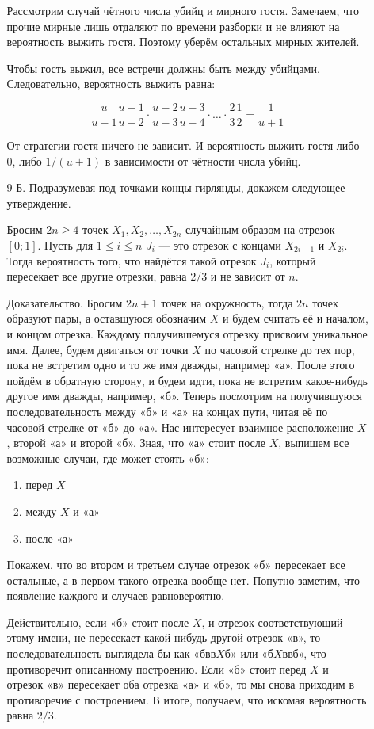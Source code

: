 \begin{enumerate}
\begin{enumerate}
Рассмотрим случай чётного числа убийц и мирного гостя. Замечаем, что прочие мирные
лишь отдаляют по времени разборки и не влияют на вероятность выжить гостя.
Поэтому уберём остальных мирных жителей.

Чтобы гость выжил, все встречи должны быть между убийцами. Следовательно, вероятность
выжить равна:

\[
\frac{u}{u-1}\frac{u-1}{u-2} \cdot \frac{u-2}{u-3}\frac{u-3}{u-4}\cdot \ldots
\cdot \frac{2}{3}\frac{1}{2} = \frac{1}{u+1}
\]

От стратегии гостя ничего не зависит.
И вероятность выжить гостя либо 0, либо $1/(u+1)$ в зависимости от чётности числа убийц.

\item[9-Б.]
Подразумевая под точками концы гирлянды, докажем следующее утверждение.

Бросим $2n \geq 4$ точек $X_1, X_2, \ldots, X_{2n}$ случайным образом на отрезок
$[0;1]$. Пусть для $1 \leq i \leq n$ $J_i$ — это отрезок с концами $X_{2i-1}$ и $X_{2i}$.
Тогда вероятность того, что найдётся такой отрезок $J_i$, который пересекает все
другие отрезки, равна $2/3$ и не зависит от $n$.

Доказательство. Бросим $2n+1$ точек на окружность, тогда $2n$ точек образуют пары,
а оставшуюся обозначим $X$ и будем считать её и началом, и концом отрезка. Каждому
получившемуся отрезку присвоим уникальное имя. Далее, будем двигаться от точки $X$
по часовой стрелке до тех пор, пока не встретим одно и то же имя дважды, например «а».
После этого пойдём в обратную сторону, и будем идти, пока не встретим какое-нибудь
другое имя дважды, например, «б». Теперь посмотрим на получившуюся последовательность
между «б» и «а» на концах пути, читая её по часовой стрелке от «б» до «а». Нас
интересует взаимное расположение $X$, второй «а» и второй «б». Зная, что «а» стоит
после $X$, выпишем все возможные случаи, где может стоять «б»:
\begin{enumerate}
\item перед $X$
\item между $X$ и «а»
\item после «а»
\end{enumerate}
Покажем, что во втором и третьем случае отрезок «б» пересекает все остальные, а в
первом такого отрезка вообще нет. Попутно заметим, что появление каждого и случаев
равновероятно.

Действительно, если «б» стоит после $X$, и отрезок соответствующий этому имени,
не пересекает какой-нибудь другой отрезок «в», то последовательность выглядела бы
как «бвв$X$б» или «б$X$ввб», что противоречит описанному построению.
Если «б» стоит перед $X$ и отрезок «в» пересекает оба отрезка «а» и «б», то мы
снова приходим в противоречие с построением. В итоге, получаем, что искомая вероятность
равна $2/3$.
\end{enumerate}
\end{enumerate}




